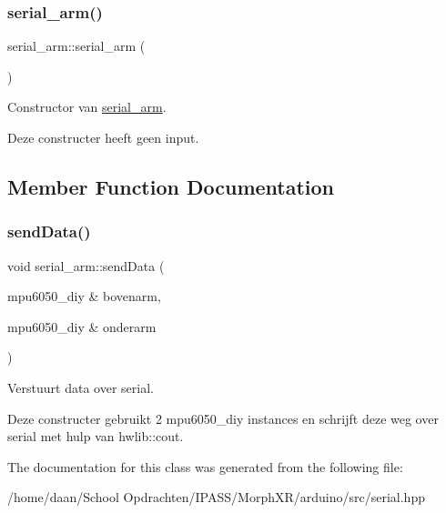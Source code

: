 \subsubsection{\texorpdfstring{serial\+\_\+arm()}{serial\_arm()}}
{\footnotesize\ttfamily serial\+\_\+arm\+::serial\+\_\+arm (\begin{DoxyParamCaption}{ }\end{DoxyParamCaption})\hspace{0.3cm}{\ttfamily [inline]}}



Constructor van \hyperlink{classserial__arm}{serial\+\_\+arm}. 

Deze constructer heeft geen input. 

\subsection{Member Function Documentation}
\mbox{\label{classserial__arm_a61f41ba18be300410cfb730ca649c3e7}} 
\subsubsection{\texorpdfstring{send\+Data()}{sendData()}}
{\footnotesize\ttfamily void serial\+\_\+arm\+::send\+Data (\begin{DoxyParamCaption}\item[{mpu6050\+\_\+diy \&}]{bovenarm,  }\item[{mpu6050\+\_\+diy \&}]{onderarm }\end{DoxyParamCaption})\hspace{0.3cm}{\ttfamily [inline]}}



Verstuurt data over serial. 

Deze constructer gebruikt 2 mpu6050\+\_\+diy instances en schrijft deze weg over serial met hulp van hwlib\+::cout. 

The documentation for this class was generated from the following file\+:\begin{DoxyCompactItemize}
\item 
/home/daan/\+School Opdrachten/\+I\+P\+A\+S\+S/\+Morph\+X\+R/arduino/src/serial.\+hpp\end{DoxyCompactItemize}
